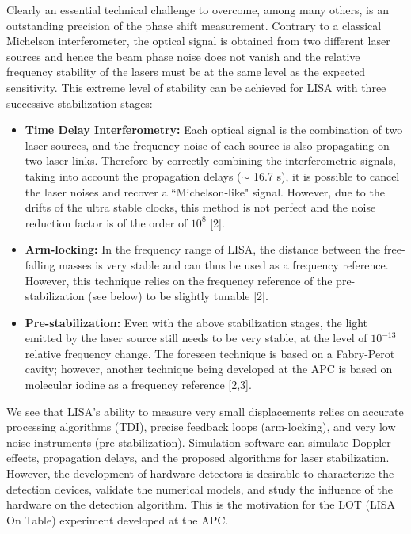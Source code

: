 \documentclass[11 pt]{article}
\begin{document}
Clearly an essential technical challenge to overcome, among many others, is an outstanding precision of the phase shift measurement. Contrary to a classical Michelson interferometer, the optical signal is obtained from two different laser sources and hence the beam phase noise does not vanish and the relative frequency stability of the lasers must be at the same level as the expected sensitivity. This extreme level of stability can be achieved for LISA with three successive stabilization stages:
\begin{itemize}
\item{\bf{Time Delay Interferometry:}} Each optical signal is the combination of two laser sources, and the frequency noise of each source is also propagating on two laser links. Therefore by correctly combining the interferometric signals, taking into account the propagation delays ($\sim$ 16.7 s), it is possible to cancel the laser noises and recover a ``Michelson-like" signal. However, due to the drifts of the ultra stable clocks, this method is not perfect and the noise reduction factor is of the order of $10^8$ [2].
\item{\bf{Arm-locking:}} In the frequency range of LISA, the distance between the free-falling masses is very stable and can thus be used as a frequency reference. However, this technique relies on the frequency reference of the pre-stabilization (see below) to be slightly tunable [2].
\item{\bf{Pre-stabilization:}} Even with the above stabilization stages, the light emitted by the laser source still needs to be very stable, at the level of $10^{-13}$ relative frequency change. The foreseen technique is based on a Fabry-Perot cavity; however, another technique being developed at the APC is based on molecular iodine as a frequency reference [2,3].
\end{itemize}

We see that LISA's ability to measure very small displacements relies on accurate processing algorithms (TDI), precise feedback loops (arm-locking), and very low noise instruments (pre-stabilization). Simulation software can simulate Doppler effects, propagation delays, and the proposed algorithms for laser stabilization. However, the development of hardware detectors is desirable to characterize the detection devices, validate the numerical models, and study the influence of the hardware on the detection algorithm. This is the motivation for the LOT (LISA On Table) experiment developed at the APC.
\end{document}
